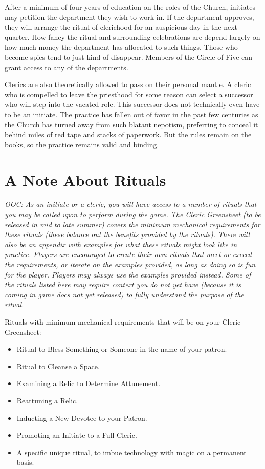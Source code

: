 \documentclass[blue]{GL2020}
\begin{document}
After a minimum of four years of education on the roles of the Church, initiates may petition the department they wish to work in. If the department approves, they will arrange the ritual of clerichood for an auspicious day in the next quarter. How fancy the ritual and surrounding celebrations are depend largely on how much money the department has allocated to such things. Those who become spies tend to just kind of disappear. Members of the Circle of Five can grant access to any of the departments. 

Clerics are also theoretically allowed to pass on their personal mantle. A cleric who is compelled to leave the priesthood for some reason can select a successor who will step into the vacated role. This successor does not technically even have to be an initiate. The practice has fallen out of favor in the past few centuries as the Church has turned away from such blatant nepotism, preferring to conceal it behind miles of red tape and stacks of paperwork. But the rules remain on the books, so the practice remains valid and binding.

\section*{A Note About Rituals}
\emph{OOC: As an initiate or a cleric, you will have access to a number of rituals that you may be called upon to perform during the game. The Cleric Greensheet (to be released in mid to late summer) covers the minimum mechanical requirements for these rituals (these balance out the benefits provided by the rituals). There will also be an appendix with examples for what these rituals might look like in practice. Players are encouraged to create their own rituals that meet or exceed the requirements, or iterate on the examples provided, as long as doing so is fun for the player. Players may always use the examples provided instead. Some of the rituals listed here may require context you do not yet have (because it is coming in game docs not yet released) to fully understand the purpose of the ritual.}

Rituals with minimum mechanical requirements that will be on your Cleric Greensheet:
\begin{itemize}
  \item Ritual to Bless Something or Someone in the name of your patron.
  \item Ritual to Cleanse a Space.
  \item Examining a Relic to Determine Attunement.
  \item Reattuning a Relic.
  \item Inducting a New Devotee to your Patron.
  \item Promoting an Initiate to a Full Cleric.
  \item A \pTech{} specific unique ritual, to imbue technology with magic on a permanent basis.
\end{itemize}
\end{document}
